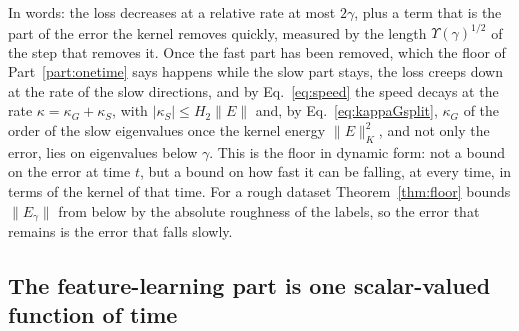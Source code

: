 \documentclass[11pt]{article}
\theoremstyle{definition}
\theoremstyle{remark}
\begin{document}
In words: the loss decreases at a relative rate at most $2\gamma$, plus a term that is the part of the error the kernel removes quickly, measured by the length $\Upsilon(\gamma)^{1/2}$ of the step that removes it.
Once the fast part has been removed, which the floor of Part~\ref{part:onetime} says happens while the slow part stays, the loss creeps down at the rate of the slow directions, and by Eq.~\eqref{eq:speed} the speed decays at the rate $\kappa = \kappa_G + \kappa_S$, with $|\kappa_S|\le H_2\|E\|$ and, by Eq.~\eqref{eq:kappaGsplit}, $\kappa_G$ of the order of the slow eigenvalues once the kernel energy $\|E\|_K^2$, and not only the error, lies on eigenvalues below $\gamma$.
This is the floor in dynamic form: not a bound on the error at time $t$, but a bound on how fast it can be falling, at every time, in terms of the kernel of that time.
For a rough dataset Theorem~\ref{thm:floor} bounds $\|E_\gamma\|$ from below by the absolute roughness of the labels, so the error that remains is the error that falls slowly.

\subsection{The feature-learning part is one scalar-valued function of time}
\end{document}

